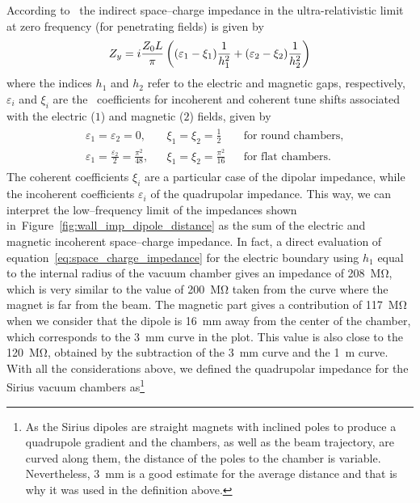     According to~ the indirect space--charge impedance in the ultra-relativistic limit at zero frequency (for penetrating fields) is given by
    \begin{align}\label{eq:space_charge_impedance}
        Z_y = i\frac{Z_0L}{\pi}\left((\varepsilon_1-\xi_1)\frac{1}{h_1^2} +
                                         (\varepsilon_2-\xi_2)\frac{1}{h_2^2}\right)
    \end{align}
    where the indices $h_1$ and $h_2$ refer to the electric and magnetic gaps, respectively, $\varepsilon_i$ and $\xi_i$ are the~ coefficients for incoherent and coherent tune shifts associated with the electric ($1$) and magnetic ($2$) fields, given by
    \begin{align}\label{eq:laslett_coefficients}
        \begin{aligned}
            &\varepsilon_1 = \varepsilon_2 = 0, & &
            \xi_1 = \xi_2 = \frac12 & &
            \text{for round chambers},\\
            &\varepsilon_1=\frac{\varepsilon_2}{2} = \frac{\pi^2}{48}, & &
            \xi_1 = \xi_2 = \frac{\pi^2}{16} & &
            \text{for flat chambers.}
        \end{aligned}
    \end{align}
    The coherent coefficients $\xi_i$ are a particular case of the dipolar impedance, while the incoherent coefficients $\varepsilon_i$ of the quadrupolar impedance. This way, we can interpret the low--frequency limit of the impedances shown in~Figure~\ref{fig:wall_imp_dipole_distance} as the sum of the electric and magnetic incoherent space--charge impedance. In fact, a direct evaluation of equation~\eqref{eq:space_charge_impedance} for the electric boundary using $h_1$ equal to the internal radius of the vacuum chamber gives an impedance of \SI{208}{\mega\ohm},
    which is very similar to the value of \SI{200}{\mega\ohm} taken from the curve where the magnet is far from the beam. The magnetic part gives a contribution of \SI{117}{\mega\ohm} when we consider that the dipole is \SI{16}{\milli\meter} away from the center of the chamber, which corresponds to the \SI{3}{\milli\meter} curve in the plot. This value is also close to the \SI{120}{\mega\ohm}, obtained by the subtraction of the \SI{3}{\milli\meter} curve and the \SI{1}{\meter} curve. With all the considerations above, we defined the quadrupolar impedance for the Sirius vacuum chambers as\footnote{As the Sirius dipoles are straight magnets with inclined poles to produce a quadrupole gradient and the chambers, as well as the beam trajectory, are curved along them, the distance of the poles to the chamber is variable. Nevertheless, \SI{3}{\milli\meter} is a good estimate for the average distance and that is why it was used in the definition above.}
